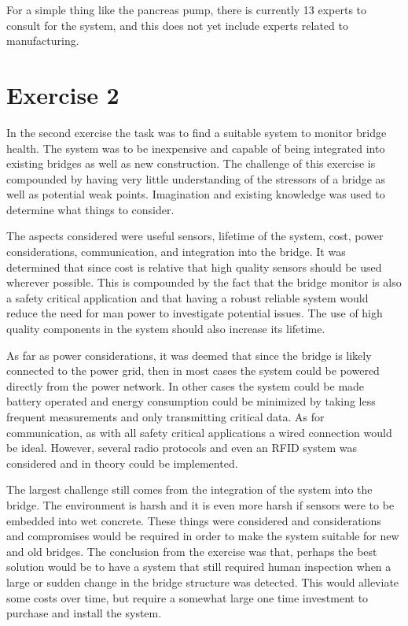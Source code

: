 \documentclass[english,12pt,a4paper,pdftex,elec,utf8]{aaltothesis}
\begin{document}
	For a simple thing like the pancreas pump, there is currently 13 experts to consult for the system, and this does not yet include experts related to manufacturing.  


\newpage


\section*{Exercise 2}

	In the second exercise the task was to find a suitable system to monitor bridge health. The system was to be inexpensive and capable of being integrated into existing bridges as well as new construction. The challenge of this exercise is compounded by having very little understanding of the stressors of a bridge as well as potential weak points. Imagination and existing knowledge was used to determine what things to consider.
	
	The aspects considered were useful sensors, lifetime of the system, cost, power considerations, communication, and integration into the bridge. It was determined that since cost is relative that high quality sensors should be used wherever possible. This is compounded by the fact that the bridge monitor is also a safety critical application and that having a robust reliable system would reduce the need for man power to investigate potential issues. The use of high quality components in the system should also increase its lifetime. 
	
	As far as power considerations, it was deemed that since the bridge is likely connected to the power grid, then in most cases the system could be powered directly from the power network. In other cases the system could be made battery operated and energy consumption could be minimized by taking less frequent measurements and only transmitting critical data. As for communication, as with all safety critical applications a wired connection would be ideal. However, several radio protocols and even an RFID system was considered and in theory could be implemented. 
	
	The largest challenge still comes from the integration of the system into the bridge. The environment is harsh and it is even more harsh if sensors were to be embedded into wet concrete. These things were considered and considerations and compromises would be required in order to make the system suitable for new and old bridges. The conclusion from the exercise was that, perhaps the best solution would be to have a system that still required human inspection when a large or sudden change in the bridge structure was detected. This would alleviate some costs over time, but require a somewhat large one time investment to purchase and install  the system. 
	
\end{document}
